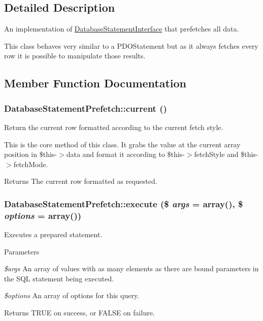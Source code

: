 \subsection{Detailed Description}
An implementation of \hyperlink{interfaceDatabaseStatementInterface}{DatabaseStatementInterface} that prefetches all data.

This class behaves very similar to a PDOStatement but as it always fetches every row it is possible to manipulate those results. 

\subsection{Member Function Documentation}
\hypertarget{classDatabaseStatementPrefetch_a84091d922961e144db757e33fe4f842e}{
\subsubsection[{current}]{\setlength{\rightskip}{0pt plus 5cm}DatabaseStatementPrefetch::current ()}}
\label{classDatabaseStatementPrefetch_a84091d922961e144db757e33fe4f842e}
Return the current row formatted according to the current fetch style.

This is the core method of this class. It grabs the value at the current array position in \$this-\/$>$data and format it according to \$this-\/$>$fetchStyle and \$this-\/$>$fetchMode.

\begin{DoxyReturn}{Returns}
The current row formatted as requested. 
\end{DoxyReturn}
\hypertarget{classDatabaseStatementPrefetch_a302e9f0e9aa09e2a8ccd7bd17679f8cd}{
\subsubsection[{execute}]{\setlength{\rightskip}{0pt plus 5cm}DatabaseStatementPrefetch::execute (\$ {\em args} = {\ttfamily array()}, \/  \$ {\em options} = {\ttfamily array()})}}
\label{classDatabaseStatementPrefetch_a302e9f0e9aa09e2a8ccd7bd17679f8cd}
Executes a prepared statement.


\begin{DoxyParams}{Parameters}
\item[{\em \$args}]An array of values with as many elements as there are bound parameters in the SQL statement being executed. \item[{\em \$options}]An array of options for this query. \end{DoxyParams}
\begin{DoxyReturn}{Returns}
TRUE on success, or FALSE on failure. 
\end{DoxyReturn}


